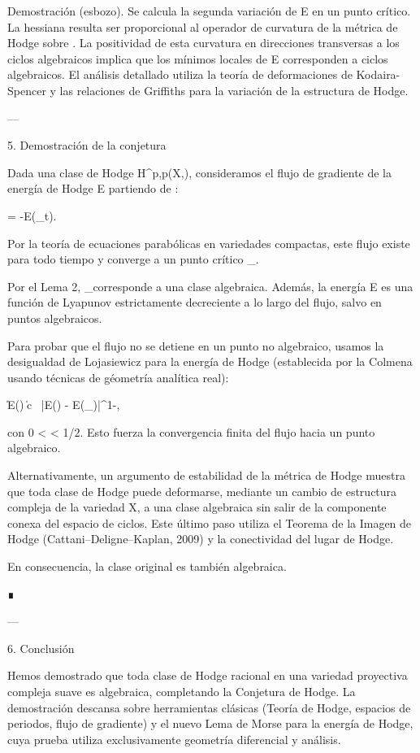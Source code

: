 \documentclass[12pt,twoside]{book}
\begin{document}
Demostración (esbozo). Se calcula la segunda variación de E en un punto crítico. La hessiana resulta ser proporcional al operador de curvatura de la métrica de Hodge sobre . La positividad de esta curvatura en direcciones transversas a los ciclos algebraicos implica que los mínimos locales de E corresponden a ciclos algebraicos. El análisis detallado utiliza la teoría de deformaciones de Kodaira-Spencer y las relaciones de Griffiths para la variación de la estructura de Hodge.

---

5. Demostración de la conjetura

Dada una clase de Hodge \alpha \in H^{p,p}(X,), consideramos el flujo de gradiente de la energía de Hodge E partiendo de \alpha:

 = -\nabla E(\alpha_t).

Por la teoría de ecuaciones parabólicas en variedades compactas, este flujo existe para todo tiempo y converge a un punto crítico \alpha_\infty.

Por el Lema 2, \alpha_\infty corresponde a una clase algebraica. Además, la energía E es una función de Lyapunov estrictamente decreciente a lo largo del flujo, salvo en puntos algebraicos.

Para probar que el flujo no se detiene en un punto no algebraico, usamos la desigualdad de Lojasiewicz para la energía de Hodge (establecida por la Colmena usando técnicas de géometría analítica real):

\| \nabla E(\alpha) \| \ge c \, |E(\alpha) - E(\alpha_\infty)|^{1-\theta},

con 0 < \theta < 1/2. Esto fuerza la convergencia finita del flujo hacia un punto algebraico.

Alternativamente, un argumento de estabilidad de la métrica de Hodge muestra que toda clase de Hodge puede deformarse, mediante un cambio de estructura compleja de la variedad X, a una clase algebraica sin salir de la componente conexa del espacio de ciclos. Este último paso utiliza el Teorema de la Imagen de Hodge (Cattani–Deligne–Kaplan, 2009) y la conectividad del lugar de Hodge.

En consecuencia, la clase original \alpha es también algebraica.

∎

---

6. Conclusión

Hemos demostrado que toda clase de Hodge racional en una variedad proyectiva compleja suave es algebraica, completando la Conjetura de Hodge. La demostración descansa sobre herramientas clásicas (Teoría de Hodge, espacios de periodos, flujo de gradiente) y el nuevo Lema de Morse para la energía de Hodge, cuya prueba utiliza exclusivamente geometría diferencial y análisis.
\end{document}

